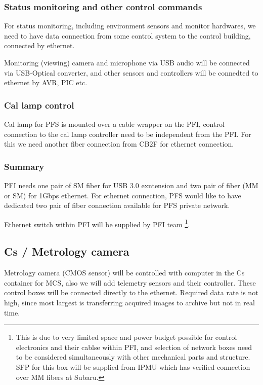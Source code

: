 \documentclass[a4paper,notitlepage]{article}
\begin{document}
\subsubsection{Status monitoring and other control commands}

For status monitoring, including environment sensors and monitor hardwares, 
we need to have data connection from some control system to the control 
building, connected by ethernet. 

Monitoring (viewing) camera and microphone via USB audio will be 
connected via USB-Optical converter, and other sensors and controllers will be 
connedted to ethernet by AVR, PIC etc. 

\subsubsection{Cal lamp control}

Cal lamp for PFS is mounted over a cable wrapper on the PFI, control connection 
to the cal lamp controller need to be independent from the PFI. 
For this we need another fiber connection from CB2F for ethernet connection. 

\subsubsection{Summary}

PFI needs one pair of SM fiber for USB 3.0 exntension and two pair of 
fiber (MM or SM) for 1Gbps ethernet. 
For ethernet connection, PFS would like to have dedicated two pair of fiber 
connection available for PFS private network. 

Ethernet switch within PFI will be supplied by PFI team
\footnote{This is due to very limited space and power budget possible for 
control electronics and their cablse within PFI, and selection of network 
boxes need to be considered simultaneously with other mechanical parts and 
structure. SFP for this box will be supplied from IPMU which has verified 
connection over MM fibers at Subaru.}. 

\subsection{Cs / Metrology camera}

Metrology camera (CMOS sensor) will be controlled with computer in the Cs 
container for MCS, 
also we will add telemetry sensors and their controller. 
These control boxes will be connected directly to the ethernet. 
Required data rate is not high, since most largest is transferring acquired 
images to archive but not in real time. 
\end{document}
